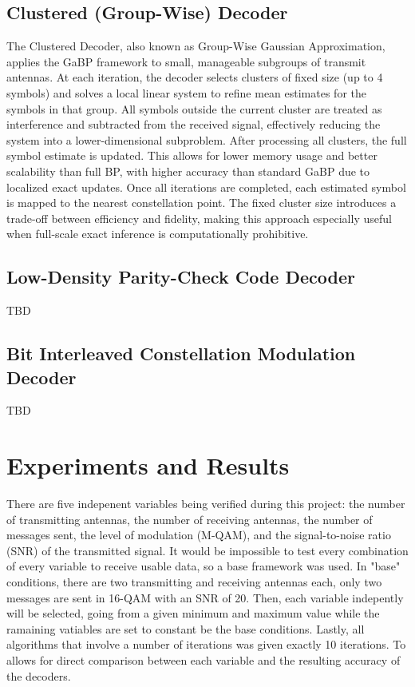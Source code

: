 \documentclass[conference]{IEEEtran}
\begin{document}
\subsection{Clustered (Group-Wise) Decoder}
The Clustered Decoder, also known as Group-Wise Gaussian Approximation, applies the GaBP framework to small, manageable subgroups of transmit antennas. At each iteration, the decoder selects clusters of fixed size (up to 4 symbols) and solves a local linear system to refine mean estimates for the symbols in that group. All symbols outside the current cluster are treated as interference and subtracted from the received signal, effectively reducing the system into a lower-dimensional subproblem. After processing all clusters, the full symbol estimate is updated. This allows for lower memory usage and better scalability than full BP, with higher accuracy than standard GaBP due to localized exact updates. Once all iterations are completed, each estimated symbol is mapped to the nearest constellation point. The fixed cluster size introduces a trade-off between efficiency and fidelity, making this approach especially useful when full-scale exact inference is computationally prohibitive.

\subsection{Low-Density Parity-Check Code Decoder}
TBD

\subsection{Bit Interleaved Constellation Modulation Decoder}
TBD

\section{Experiments and Results}
There are five indepenent variables being verified during this project: the number of transmitting antennas, the number of receiving antennas, the number of messages sent, the level of modulation (M-QAM), and the signal-to-noise ratio (SNR) of the transmitted signal. It would be impossible to test every combination of every variable to receive usable data, so a base framework was used. In "base" conditions, there are two transmitting and receiving antennas each, only two messages are sent in 16-QAM with an SNR of 20. Then, each variable indepently will be selected, going from a given minimum and maximum value while the ramaining vatiables are set to constant be the base conditions. Lastly, all algorithms that involve a number of iterations was given exactly 10 iterations. To allows for direct comparison between each variable and the resulting accuracy of the decoders.
\end{document}
